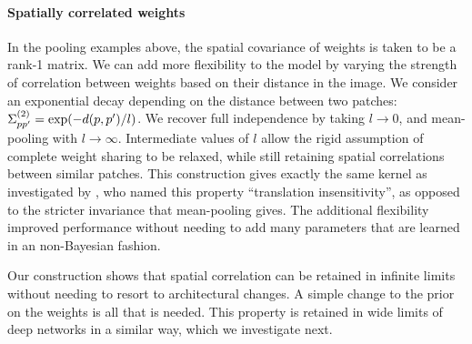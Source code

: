 \documentclass[tablecaption=bottom,wcp,nonatbib]{jmlr} %
\begin{document}
\paragraph{Spatially correlated weights} In the pooling examples above, the spatial covariance of weights is taken to be a rank-1 matrix. We can add more flexibility to the model by varying the strength of correlation between weights based on their distance in the image. We consider an exponential decay depending on the distance between two patches: $\Sigma^{(2)}_{pp'} = \exp(-d(p, p')/l)$. We recover full independence by taking $l\to 0$, and mean-pooling with $l\to\infty$. Intermediate values of $l$ allow the rigid assumption of complete weight sharing to be relaxed, while still retaining spatial correlations between similar patches. This construction gives exactly the same kernel as investigated by \citet{dutordoir2020}, who named this property ``translation insensitivity'', as opposed to the stricter invariance that mean-pooling gives. The additional flexibility improved performance without needing to add many parameters that are learned in an non-Bayesian fashion.

Our construction shows that spatial correlation can be retained in infinite limits without needing to resort to architectural changes. A simple change to the prior on the weights is all that is needed. This property is retained in wide limits of deep networks in a similar way, which we investigate next.



\end{document}
